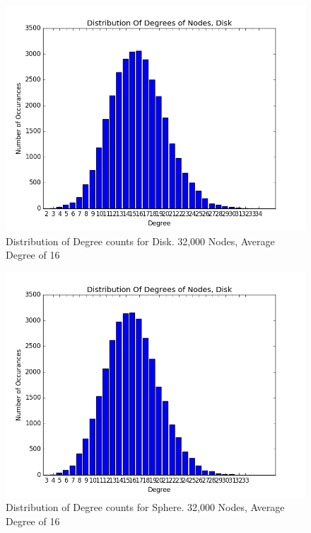 \documentclass{article}
\begin{document}
\begin{figure}
    \centering
    \includegraphics[scale=0.6]{./graphs/hist_deg_disk.png}
    \caption{Distribution of Degree counts for Disk. 32,000 Nodes, Average Degree of 16}
    \label{diskdeghist}
\end{figure}

\begin{figure}
    \centering
    \includegraphics[scale=0.6]{./graphs/hist_deg_sphere.png}
    \caption{Distribution of Degree counts for Sphere. 32,000 Nodes, Average Degree of 16}
    \label{spheredeghist}
\end{figure}
\end{document}
